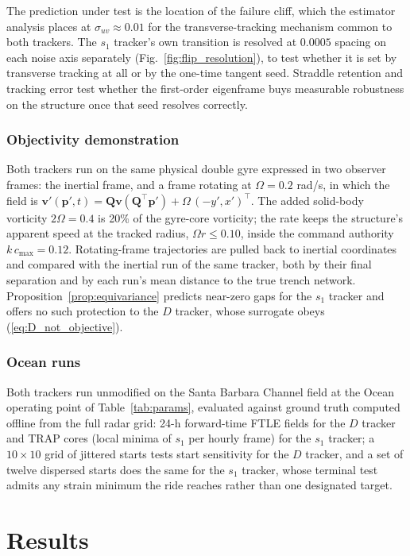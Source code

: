 \documentclass[lettersize,journal]{IEEEtran}
\begin{document}
The prediction under test is the location of the failure cliff, which
the estimator analysis places at $\sigma_{uv} \approx 0.01$ for the
transverse-tracking mechanism common to both trackers. The $s_1$
tracker's own transition is resolved at $0.0005$ spacing on each noise
axis separately (Fig.~\ref{fig:flip_resolution}), to test whether it is
set by transverse tracking at all or by the one-time tangent seed.
Straddle retention and tracking error test whether the first-order
eigenframe buys measurable robustness on the structure once that seed
resolves correctly.

\subsubsection{Objectivity demonstration}
Both trackers run on the same physical double gyre expressed in two
observer frames: the inertial frame, and a frame rotating at
$\Omega = 0.2$ rad/s, in which the field is
$\mathbf{v}'(\mathbf{p}', t) = \mathbf{Q}\mathbf{v}(\mathbf{Q}^\top
\mathbf{p}') + \Omega\,(-y', x')^\top$. The added solid-body vorticity
$2\Omega = 0.4$ is 20\% of the gyre-core vorticity; the rate keeps the
structure's apparent speed at the tracked radius, $\Omega r \leq 0.10$,
inside the command authority $k\,c_{\max} = 0.12$. Rotating-frame
trajectories are pulled back to inertial coordinates and compared with
the inertial run of the same tracker, both by their final separation and
by each run's mean distance to the true trench network.
Proposition~\ref{prop:equivariance} predicts near-zero gaps for the
$s_1$ tracker and offers no such protection to the $D$ tracker, whose
surrogate obeys (\ref{eq:D_not_objective}).

\subsubsection{Ocean runs}
Both trackers run unmodified on the Santa Barbara Channel field at the
Ocean operating point of Table~\ref{tab:params}, evaluated against
ground truth computed offline from the full radar grid: 24-h
forward-time FTLE fields for the $D$ tracker and TRAP cores (local
minima of $s_1$ per hourly frame) for the $s_1$ tracker; a $10 \times
10$ grid of jittered starts tests start sensitivity for the $D$ tracker,
and a set of twelve dispersed starts does the same for the $s_1$
tracker, whose terminal test admits any strain minimum the ride reaches
rather than one designated target.

\section{Results}
\label{sec:results}
\end{document}
